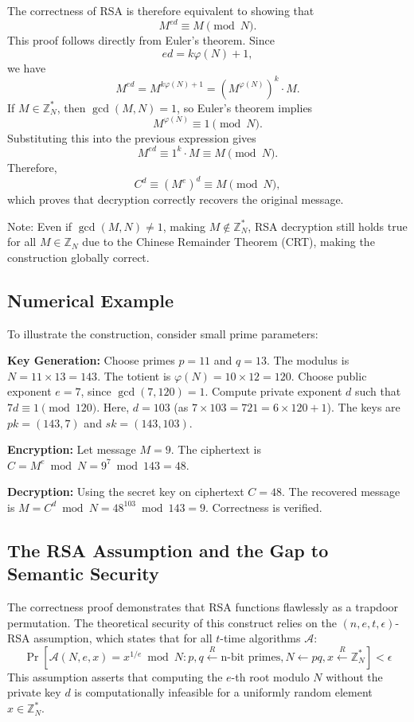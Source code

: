 The correctness of RSA is therefore equivalent to showing that
\[
M^{ed} \equiv M \pmod{N}.
\]
This proof follows directly from Euler's theorem. Since
\[
ed = k\varphi(N)+1,
\]
we have
\[
M^{ed} = M^{k\varphi(N)+1} = \left(M^{\varphi(N)}\right)^k \cdot M.
\]
If $M \in \mathbb{Z}_N^{\ast}$, then $\gcd(M,N)=1$, so Euler's theorem implies
\[
M^{\varphi(N)} \equiv 1 \pmod{N}.
\]
Substituting this into the previous expression gives
\[
M^{ed} \equiv 1^k \cdot M \equiv M \pmod{N}.
\]
Therefore,
\[
C^d \equiv (M^e)^d \equiv M \pmod{N},
\]
which proves that decryption correctly recovers the original message. 

Note: Even if $\gcd(M, N) \neq 1$, making $M \notin \mathbb{Z}_N^{\ast}$, RSA decryption still holds true for all $M \in \mathbb{Z}_N$ due to the Chinese Remainder Theorem (CRT), making the construction globally correct.

\subsection{Numerical Example}

To illustrate the construction, consider small prime parameters:

\textbf{Key Generation:} Choose primes $p = 11$ and $q = 13$. The modulus is $N = 11 \times 13 = 143$. The totient is $\varphi(N) = 10 \times 12 = 120$. Choose public exponent $e = 7$, since $\gcd(7, 120) = 1$. Compute private exponent $d$ such that $7d \equiv 1 \pmod{120}$. Here, $d = 103$ (as $7 \times 103 = 721 = 6 \times 120 + 1$). The keys are $pk = (143, 7)$ and $sk = (143, 103)$.

\textbf{Encryption:} Let message $M = 9$. The ciphertext is $C = M^e \bmod N = 9^7 \bmod 143 = 48$.

\textbf{Decryption:} Using the secret key on ciphertext $C = 48$. The recovered message is $M = C^d \bmod N = 48^{103} \bmod 143 = 9$. Correctness is verified.

\subsection{The RSA Assumption and the Gap to Semantic Security}

The correctness proof demonstrates that RSA functions flawlessly as a trapdoor permutation. The theoretical security of this construct relies on the $(n, e, t, \epsilon)$-RSA assumption, which states that for all $t$-time algorithms $\mathcal{A}$:
\[
\Pr \left[ \mathcal{A}(N, e, x) = x^{1/e} \bmod N : p, q \xleftarrow{R} \text{n-bit primes}, N \leftarrow pq, x \xleftarrow{R} \mathbb{Z}_N^{\ast} \right] < \epsilon
\]
This assumption asserts that computing the $e$-th root modulo $N$ without the private key $d$ is computationally infeasible for a uniformly random element $x \in \mathbb{Z}_N^{\ast}$.

